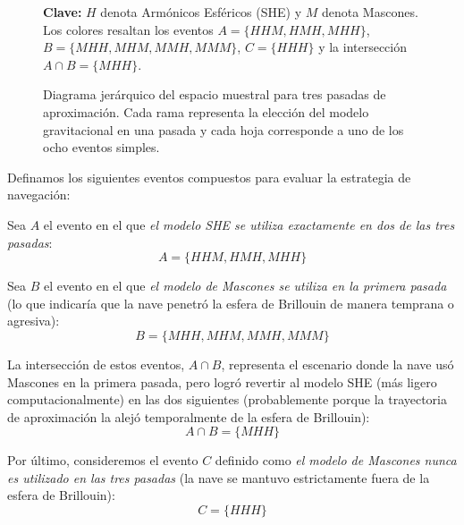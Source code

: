 \begin{figure}[htbp]

\vspace{2mm}
\begin{minipage}{0.96\textwidth}
\footnotesize
\textbf{Clave:} \textcolor{blue!70!black}{$H$} denota Armónicos Esféricos (SHE) y \textcolor{orange!85!black}{$M$} denota Mascones. Los colores resaltan los eventos $A=\{HHM, HMH, MHH\}$, $B=\{MHH, MHM, MMH, MMM\}$, $C=\{HHH\}$ y la intersección $A\cap B=\{MHH\}$.
\end{minipage}
\caption{Diagrama jerárquico del espacio muestral para tres pasadas de aproximación. Cada rama representa la elección del modelo gravitacional en una pasada y cada hoja corresponde a uno de los ocho eventos simples.}
\end{figure}



Definamos los siguientes eventos compuestos para evaluar la estrategia de navegación:

Sea $A$ el evento en el que \textit{el modelo SHE se utiliza exactamente en dos de las tres pasadas}:
$$ A = \{HHM, HMH, MHH\} $$

Sea $B$ el evento en el que \textit{el modelo de Mascones se utiliza en la primera pasada} (lo que indicaría que la nave penetró la esfera de Brillouin de manera temprana o agresiva):
$$ B = \{MHH, MHM, MMH, MMM\} $$

La intersección de estos eventos, $A \cap B$, representa el escenario donde la nave usó Mascones en la primera pasada, pero logró revertir al modelo SHE (más ligero computacionalmente) en las dos siguientes (probablemente porque la trayectoria de aproximación la alejó temporalmente de la esfera de Brillouin):
$$ A \cap B = \{MHH\} $$

Por último, consideremos el evento $C$ definido como \textit{el modelo de Mascones nunca es utilizado en las tres pasadas} (la nave se mantuvo estrictamente fuera de la esfera de Brillouin):
$$ C = \{HHH\} $$

